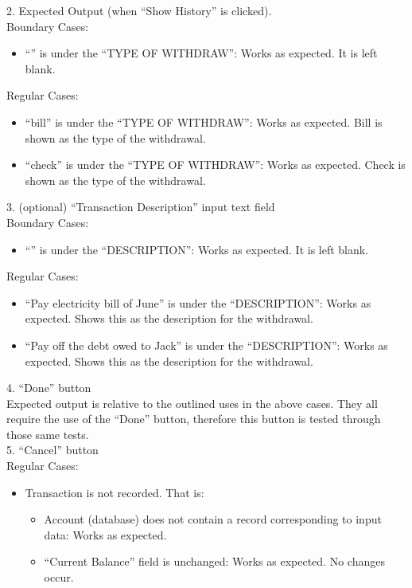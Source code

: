 \documentclass[12pt]{article}
\begin{document}
2. Expected Output (when ``Show History'' is clicked).\\

Boundary Cases:
\begin{itemize}
  \item ``'' is under the ``TYPE OF WITHDRAW'': Works as expected. It is left blank.
\end{itemize}

Regular Cases:
\begin{itemize}
  \item ``bill'' is under the ``TYPE OF WITHDRAW'': Works as expected. Bill is shown as the type of the withdrawal.
  \item ``check'' is under the ``TYPE OF WITHDRAW'': Works as expected. Check is shown as the type of the withdrawal.
\end{itemize}

3. (optional) ``Transaction Description'' input text field\\

Boundary Cases:
\begin{itemize}
  \item ``'' is under the ``DESCRIPTION'': Works as expected. It is left blank.
\end{itemize}

Regular Cases:
\begin{itemize}
  \item  ``Pay electricity bill of June'' is under the ``DESCRIPTION'': Works as expected. Shows this as the description for the withdrawal.
  \item  ``Pay off the debt owed to Jack'' is under the ``DESCRIPTION'': Works as expected. Shows this as the description for the withdrawal.
\end{itemize}

4. ``Done'' button\\

Expected output is relative to the outlined uses in the above cases. They all require the use of the ``Done'' button, therefore this button is tested through those same tests.\\
	
5. ``Cancel'' button\\

Regular Cases:
\begin{itemize}
  \item Transaction is not recorded. That is:
  \begin{itemize}
    \item Account (database) does not contain a record corresponding to input data: Works as expected.
    \item ``Current Balance'' field is unchanged: Works as expected. No changes occur.
  \end{itemize}
\end{itemize}
\end{document}
